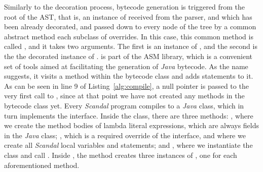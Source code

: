 Similarly to the decoration process, bytecode generation is triggered from the root of the AST, that is, an instance of  received from the parser, and which has been already decorated, and passed down to every node of the tree by a common abstract method each subclass of  overrides. In this case, this common method is called , and it takes two arguments. The first is an instance of , and the second is the the decorated instance of .  is part of the ASM library, which is a convenient set of tools aimed at facilitating the generation of \emph{Java} bytecode. As the name suggests, it visits a method within the bytecode class and adds statements to it. As can be seen in line 9 of Listing~\ref{alg:compile}, a null pointer is passed to the very first call to , since at that point we have not created any methods in the bytecode class yet. Every \emph{Scandal} program compiles to a \emph{Java} class, which in turn implements the  interface. Inside the class, there are three methods: , where we create the method bodies of lambda literal expressions, which are always fields in the \emph{Java} class; , which is a required override of the  interface, and where we create all \emph{Scandal} local variables and statements; and , where we instantiate the class and call . Inside , the  method creates three instances of , one for each aforementioned method.


